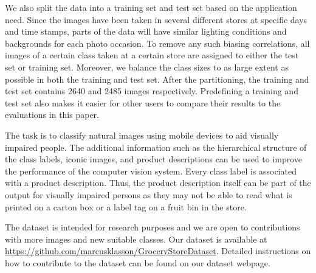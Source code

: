 We also split the data into a training set and test set based on the application need. Since the images have been taken in several different stores at specific days and time stamps, 
parts of the data will have similar lighting conditions and backgrounds for each photo occasion. To remove any such biasing correlations, all images of a certain class taken at a certain store are assigned to either the test set or training set. Moreover, we balance the class sizes to as large extent as possible in both the training and test set. After the partitioning, the training and test set contains 2640 and 2485 images respectively. Predefining a training and test set also makes it easier for other users to compare their results to the evaluations in this paper.

The task is to classify natural images using mobile devices to aid visually impaired people. The additional information such as the hierarchical structure of the class labels, iconic images, and product descriptions can be used to improve the performance of the computer vision system. Every class label is associated with a product description. Thus, the product description itself can be part of the output for visually impaired persons as they may not be able to read what is printed on a carton box or a label tag on a fruit bin in the store.

The dataset is intended for research purposes and we are open to contributions with more images and new suitable classes. Our dataset is available at \url{https://github.com/marcusklasson/GroceryStoreDataset}. Detailed instructions on how to contribute to the dataset can be found on our dataset webpage.

